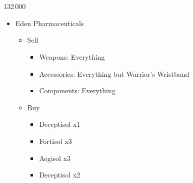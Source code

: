 \documentclass{report}
\begin{document}
\chapter{}
\begin{shop}{132\,000}
\begin{itemize}
    \item Eden Pharmaceuticals
    \begin{itemize}
        \item Sell
        \begin{itemize}
            \item Weapons: Everything
            \item Accessories: Everything but Warrior's Wristband
            \item Components: Everything
        \end{itemize}
        \item Buy
        \begin{itemize}
            \item Deceptisol x1
            \item Fortisol x3
            \item Aegisol x3
            \item Deceptisol x2
        \end{itemize}
    \end{itemize}
\end{itemize}
\end{shop}
\end{document}
